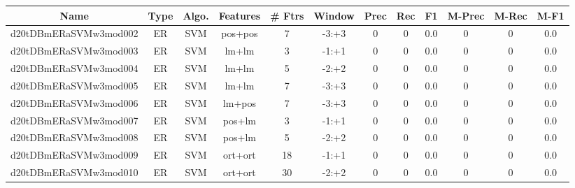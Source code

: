 \documentclass[a4paper]{article}
\begin{document}
\begin{landscape}
\begin{center}
\begin{tabular}{ |c|c|c|c|c|c|c|c|c|c|c|c|}
 \hline
\end{tabular}
\end{center}




\begin{center}
\begin{tabular}{ |c|c|c|c|c|c|c|c|c|c|c|c|} 
 \hline
 	Name & Type & Algo. & Features & \# Ftrs & Window & Prec & Rec & F1 & M-Prec & M-Rec & M-F1\\
 \hline

 	

 
 	
 	\small{ d20tDBmERaSVMw3mod002 } & ER & SVM & pos+pos  &  7 &  -3:+3  &  0 & 0 & 0.0  &  0 & 0 & 0.0 \\
 	

 
 	
 	\small{ d20tDBmERaSVMw3mod003 } & ER & SVM & lm+lm  &  3 &  -1:+1  &  0 & 0 & 0.0  &  0 & 0 & 0.0 \\
 	

 
 	
 	\small{ d20tDBmERaSVMw3mod004 } & ER & SVM & lm+lm  &  5 &  -2:+2  &  0 & 0 & 0.0  &  0 & 0 & 0.0 \\
 	

 
 	
 	\small{ d20tDBmERaSVMw3mod005 } & ER & SVM & lm+lm  &  7 &  -3:+3  &  0 & 0 & 0.0  &  0 & 0 & 0.0 \\
 	

 
 	
 	\small{ d20tDBmERaSVMw3mod006 } & ER & SVM & lm+pos  &  7 &  -3:+3  &  0 & 0 & 0.0  &  0 & 0 & 0.0 \\
 	

 
 	
 	\small{ d20tDBmERaSVMw3mod007 } & ER & SVM & pos+lm  &  3 &  -1:+1  &  0 & 0 & 0.0  &  0 & 0 & 0.0 \\
 	

 
 	
 	\small{ d20tDBmERaSVMw3mod008 } & ER & SVM & pos+lm  &  5 &  -2:+2  &  0 & 0 & 0.0  &  0 & 0 & 0.0 \\
 	

 
 	
 	\small{ d20tDBmERaSVMw3mod009 } & ER & SVM & ort+ort  &  18 &  -1:+1  &  0 & 0 & 0.0  &  0 & 0 & 0.0 \\
 	

 
 	
 	\small{ d20tDBmERaSVMw3mod010 } & ER & SVM & ort+ort  &  30 &  -2:+2  &  0 & 0 & 0.0  &  0 & 0 & 0.0 \\
 	


\end{tabular}
\end{center}
\end{landscape}
\end{document}
